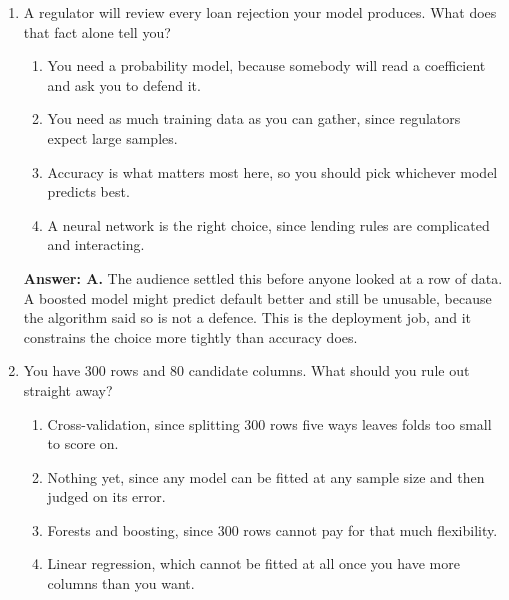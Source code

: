 \documentclass[11pt]{article}
\begin{document}
\begin{enumerate}[itemsep=14pt]
\vspace{2pt}
\textbf{Answer: B.} Two things break at once. The penalty biases every coefficient toward zero by design, so the printed numbers are not estimating what they appear to. And these 12 won a 200-way search while the inference is computed as though the model had been settled in advance. Treat what survives as a shortlist worth investigating.
\vspace{4pt}

\item A regulator will review every loan rejection your model produces. What does that fact alone tell you?

\begin{enumerate}[label=\Alph*., itemsep=1pt, topsep=3pt]
  \item You need a probability model, because somebody will read a coefficient and ask you to defend it.
  \item You need as much training data as you can gather, since regulators expect large samples.
  \item Accuracy is what matters most here, so you should pick whichever model predicts best.
  \item A neural network is the right choice, since lending rules are complicated and interacting.
\end{enumerate}

\vspace{2pt}
\textbf{Answer: A.} The audience settled this before anyone looked at a row of data. A boosted model might predict default better and still be unusable, because the algorithm said so is not a defence. This is the deployment job, and it constrains the choice more tightly than accuracy does.
\vspace{4pt}

\item You have 300 rows and 80 candidate columns. What should you rule out straight away?

\begin{enumerate}[label=\Alph*., itemsep=1pt, topsep=3pt]
  \item Cross-validation, since splitting 300 rows five ways leaves folds too small to score on.
  \item Nothing yet, since any model can be fitted at any sample size and then judged on its error.
  \item Forests and boosting, since 300 rows cannot pay for that much flexibility.
  \item Linear regression, which cannot be fitted at all once you have more columns than you want.
\end{enumerate}


\end{enumerate}
\end{document}
